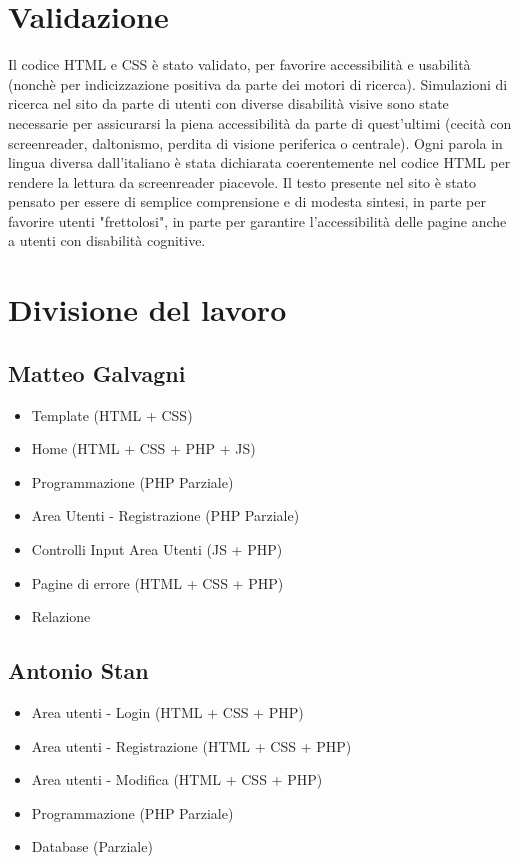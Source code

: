 \documentclass[a4paper, 12pt]{article}
\begin{document}
\section{Validazione}
Il codice HTML e CSS è stato validato, per favorire accessibilità e usabilità (nonchè per indicizzazione positiva da parte dei motori di ricerca).
Simulazioni di ricerca nel sito da parte di utenti con diverse disabilità visive sono state necessarie per assicurarsi la piena accessibilità da parte di quest'ultimi (cecità con screenreader, daltonismo, perdita di visione periferica o centrale).
Ogni parola in lingua diversa dall'italiano è stata dichiarata coerentemente nel codice HTML per rendere la lettura da screenreader piacevole.
Il testo presente nel sito è stato pensato per essere di semplice comprensione e di modesta sintesi, in parte per favorire utenti "frettolosi", in parte per garantire l'accessibilità delle pagine anche
a utenti con disabilità cognitive.
\newpage
\section{Divisione del lavoro}
\subsection{Matteo Galvagni}
\begin{itemize}
    \item Template (HTML + CSS)
    \item Home (HTML + CSS + PHP + JS)
    \item Programmazione (PHP Parziale)
    \item Area Utenti - Registrazione (PHP Parziale)
    \item Controlli Input Area Utenti (JS + PHP)
    \item Pagine di errore (HTML + CSS + PHP)
    \item Relazione
\end{itemize}
\subsection{Antonio Stan}
\begin{itemize}
    \item Area utenti - Login (HTML + CSS + PHP)
    \item Area utenti - Registrazione (HTML + CSS + PHP)
    \item Area utenti - Modifica (HTML + CSS + PHP)
    \item Programmazione (PHP Parziale)
    \item Database (Parziale)
\end{itemize}
\end{document}
